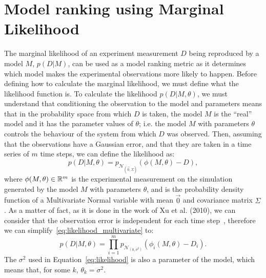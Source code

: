 \section{Model ranking using Marginal Likelihood}
\label{sec:marginal_likelihood_method}
The marginal likelihood of an experiment measurement $D$ being 
reproduced by a model $M$, $p (D | M)$, can be used as a model ranking 
metric as it determines which model makes the experimental observations 
more likely to happen. Before defining how to calculate the marginal 
likelihood, we must define what the likelihood function is. To calculate 
the likelihood $p (D | M, \theta)$, we must understand that conditioning 
the observation to the model and parameters means that in 
the probability space from which $D$ is taken, the model $M$ is the 
``real'' model and it has the parameter values of $\theta$; i.e. the 
model $M$ with parameters $\theta$ controls the behaviour of the system 
from which $D$ was observed. Then, assuming that the observations have a 
Gaussian error, and that they are taken in a time series of $m$ time 
steps, we can define the likelihood as:
\begin{equation}
    p (D | M, \theta) = p_{\mathcal{N}_{\left(\vec{0}, \Sigma\right)}}
        (\phi (M,\theta) - D),
\label{eq:likelihood_multivariate}
\end{equation}
where $\phi (M, \theta) \in \mathbb{R}^m$ is the experimental measurement 
on the simulation generated by the model $M$ with parameters $\theta$,
and  is the 
probability density function of a Multivariate Normal variable with mean 
$\vec{0}$ and covariance matrix $\Sigma$. As a matter of fact, as it is
done in the work of Xu et al. (2010), we can consider that the 
observation error is independent for each time step~\cite{Xura20}, 
therefore we can simplify~\ref{eq:likelihood_multivariate} to:
\begin{equation}
    p (D | M, \theta) = \prod_{i = 1}^m p_{\mathcal{N}_{\left(0, 
        \sigma^2\right)}} (\phi_i (M,\theta) - D_i).
\label{eq:likelihood}
\end{equation}
The $\sigma^2$ used in Equation~\ref{eq:likelihood} is also a parameter
of the model, which means that, for some $k$, $\theta_k = \sigma^2$.

